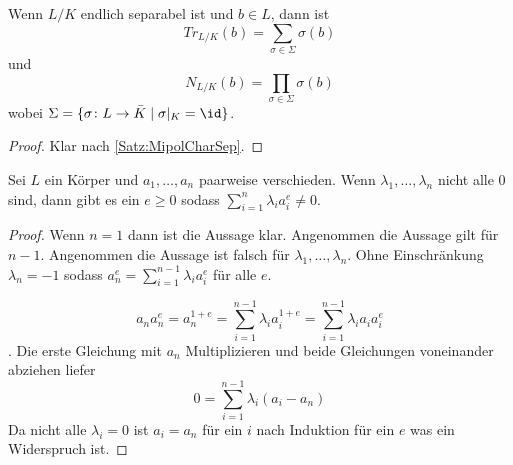 \begin{Kor}
	Wenn \(L/K\) endlich separabel ist und \(b\in L\), dann ist 
	\[Tr_{L/K}(b)=\sum_{\sigma\in\Sigma}\sigma(b)\] und
	\[N_{L/K}(b)=\prod_{\sigma\in\Sigma}\sigma(b)\] wobei
	\(\Sigma=\{\sigma\colon L\to\bar K\mid \sigma|_K=\id\}\).
\end{Kor}
\begin{proof}
	Klar nach \cref{Satz:MipolCharSep}.
\end{proof}
\begin{Lemma} Sei \(L\) ein Körper und \(a_1,\dots,a_n\) paarweise verschieden. Wenn \(\lambda_1,\dots,\lambda_n\) nicht alle \(0\) sind, dann gibt es ein \(e\geq 0\) sodass \(\sum_{i=1}^n\lambda_i a_i^e\neq 0\).
\end{Lemma}
\begin{proof}
	Wenn \(n=1\) dann ist die Aussage klar.
	Angenommen die Aussage gilt für \(n-1\). Angenommen die Aussage ist falsch für \(\lambda_1,\dots,\lambda_n\). Ohne Einschränkung \(\lambda_n=-1\) sodass \(a_n^e=\sum_{i=1}^{n-1}\lambda_i a_i ^e\) für alle \(e\).
	
	\[a_na_n^e=a_n^{1+e}=\sum_{i=1}^{n-1}\lambda_i a_i^{1+e}=\sum_{i=1}^{n-1}\lambda_i a_ia_i^e\].
	Die erste Gleichung mit \(a_n\) Multiplizieren und beide Gleichungen voneinander abziehen liefer 
	\[0=\sum_{i=1}^{n-1}\lambda_i (a_i-a_n)\]
	Da nicht alle \(\lambda_i=0\) ist \(a_i=a_n\) für ein \(i\) nach Induktion für ein \(e\) was ein Widerspruch ist.
\end{proof}
	
